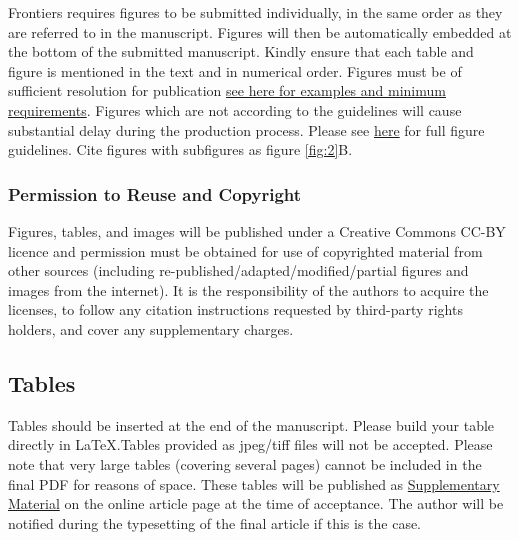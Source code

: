 \documentclass[utf8]{frontiersSCNS}
\begin{document}
Frontiers requires figures to be submitted individually, in the same
order as they are referred to in the manuscript. Figures will then be
automatically embedded at the bottom of the submitted
manuscript. Kindly ensure that each table and figure is mentioned in
the text and in numerical order. Figures must be of sufficient
resolution for publication
\href{http://home.frontiersin.org/about/author-guidelines#ResolutionRequirements}{see
  here for examples and minimum requirements}. Figures which are not
according to the guidelines will cause substantial delay during the
production process. Please see
\href{http://home.frontiersin.org/about/author-guidelines#GeneralStyleGuidelinesforFigures}{here}
for full figure guidelines. Cite figures with subfigures as figure
\ref{fig:2}B.


\subsubsection{Permission to Reuse and Copyright}

Figures, tables, and images will be published under a Creative Commons
CC-BY licence and permission must be obtained for use of copyrighted
material from other sources (including
re-published/adapted/modified/partial figures and images from the
internet). It is the responsibility of the authors to acquire the
licenses, to follow any citation instructions requested by third-party
rights holders, and cover any supplementary charges.


\subsection{Tables}

Tables should be inserted at the end of the manuscript. Please build
your table directly in LaTeX.Tables provided as jpeg/tiff files will
not be accepted. Please note that very large tables (covering several
pages) cannot be included in the final PDF for reasons of space. These
tables will be published as
\href{http://home.frontiersin.org/about/author-guidelines#SupplementaryMaterial}{Supplementary
  Material} on the online article page at the time of acceptance. The
author will be notified during the typesetting of the final article if
this is the case.
\end{document}
